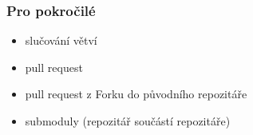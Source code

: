 \documentclass[10pt, xcolor=dvipsnames]{beamer} %
\begin{document}
\begin{frame}[fragile]
  \frametitle{Pro pokročilé}

  \begin{itemize}
    \setlength\itemsep{15pt}
    \item slučování větví
    \item pull request
    \item pull request z Forku do původního repozitáře
    \item submoduly (repozitář součástí repozitáře)
  \end{itemize}
\end{frame}
\end{document}
